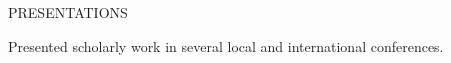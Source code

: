 \documentclass{resume} %
\begin{document}

\begin{rSection}{PRESENTATIONS}
%
\vspace*{-1em}
\item Presented scholarly work in several local and international conferences.
%
\end{rSection}
\end{document}

